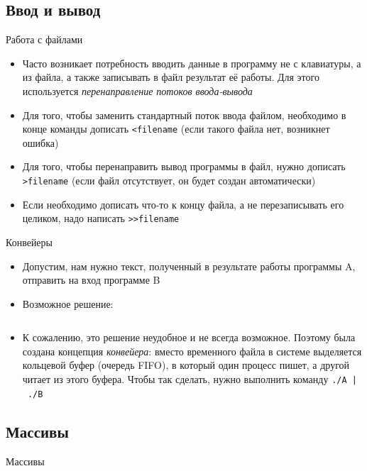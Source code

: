 \documentclass[handout]{beamer}
\begin{document}
\subsection{Ввод и вывод}
\begin{frame}{Работа с файлами}
	\begin{itemize}
		\item{Часто возникает потребность вводить данные в программу не с клавиатуры, а из файла, а также записывать в файл результат её работы. Для этого используется \emph{перенаправление потоков ввода-вывода}}\pause
		\item{Для того, чтобы заменить стандартный поток ввода файлом, необходимо в конце команды дописать \texttt{<filename} (если такого файла нет, возникнет ошибка)}\pause
		\item{Для того, чтобы перенаправить вывод программы в файл, нужно дописать \texttt{>filename} (если файл отсутствует, он будет создан автоматически)}\pause
		\item{Если необходимо дописать что-то к концу файла, а не перезаписывать его целиком, надо написать \texttt{>{}>filename}}
	\end{itemize}
\end{frame}

\begin{frame}{Конвейеры}
	\begin{itemize}
		\item{Допустим, нам нужно текст, полученный в результате работы программы A, отправить на вход программе B}\pause
		\item{Возможное решение:}
	\end{itemize}
	\vspace*{-\baselineskip}
	\inputminted[linenos,bgcolor=listing]{bash}{files/unix_quickstart/nopipe.sh}\pause
	\vspace*{-\baselineskip}
	\begin{itemize}
		\item{К сожалению, это решение неудобное и не всегда возможное. Поэтому была создана концепция \emph{конвейера}: вместо временного файла в системе выделяется кольцевой буфер (очередь FIFO), в который один процесс пишет, а другой читает из этого буфера. Чтобы так сделать, нужно выполнить команду \texttt{./A~|~./B}}
	\end{itemize}
\end{frame}

\subsection{Массивы}
\begin{frame}{Массивы}
	\inputminted[linenos,bgcolor=listing]{bash}{files/unix_quickstart/arrays.sh}
\end{frame}
\end{document}

